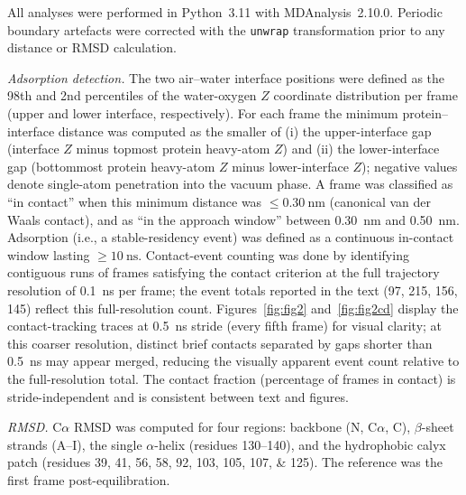 \documentclass[11pt,a4paper]{article}
\begin{document}
All analyses were performed in Python~3.11 with
MDAnalysis~2.10.0\citep{MichaudAgrawal2011,Gowers2016}. Periodic
boundary artefacts were corrected with the \texttt{unwrap} transformation
prior to any distance or RMSD calculation.

\textit{Adsorption detection.} The two air--water interface positions
were defined as the 98th and 2nd percentiles of the water-oxygen $Z$
coordinate distribution per frame (upper and lower interface,
respectively). For each frame the minimum protein--interface distance
was computed as the smaller of (i) the upper-interface gap (interface
$Z$ minus topmost protein heavy-atom $Z$) and (ii) the lower-interface
gap (bottommost protein heavy-atom $Z$ minus lower-interface $Z$);
negative values denote single-atom penetration into the vacuum phase.
A frame was classified as ``in contact'' when this minimum distance was
$\leq \SI{0.30}{\nano\metre}$ (canonical van der Waals contact), and as
``in the approach window'' between \SI{0.30}{\nano\metre} and
\SI{0.50}{\nano\metre}. Adsorption (i.e., a stable-residency event) was
defined as a continuous in-contact window lasting
$\geq \SI{10}{\nano\second}$. Contact-event counting was done by
identifying contiguous runs of frames satisfying the contact criterion
at the full trajectory resolution of \SI{0.1}{\nano\second} per frame;
the event totals reported in the text (97, 215, 156, 145) reflect this full-resolution count.
Figures~\ref{fig:fig2} and~\ref{fig:fig2cd} display the contact-tracking traces at
\SI{0.5}{\nano\second} stride (every fifth frame) for visual clarity;
at this coarser resolution, distinct brief contacts separated by gaps
shorter than \SI{0.5}{\nano\second} may appear merged, reducing the
visually apparent event count relative to the full-resolution total.
The contact fraction (percentage of frames in contact) is stride-independent
and is consistent between text and figures.

\textit{RMSD.} C$\alpha$ RMSD was computed for four regions: backbone
(N, C$\alpha$, C), $\beta$-sheet strands (A--I), the single $\alpha$-helix
(residues 130--140), and the hydrophobic calyx patch
(residues \numlist{39;41;56;58;92;103;105;107;125}). The reference was
the first frame post-equilibration.
\end{document}

